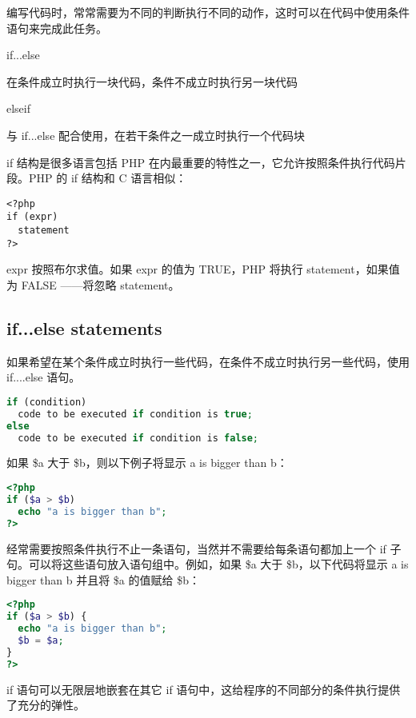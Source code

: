 编写代码时，常常需要为不同的判断执行不同的动作，这时可以在代码中使用条件语句来完成此任务。

\begin{compactitem}
\item if...else

在条件成立时执行一块代码，条件不成立时执行另一块代码

\item elseif

与 if...else 配合使用，在若干条件之一成立时执行一个代码块
\end{compactitem}

if 结构是很多语言包括 PHP 在内最重要的特性之一，它允许按照条件执行代码片段。PHP 的 if 结构和 C 语言相似：

\begin{verbatim}
<?php
if (expr)
  statement
?>
\end{verbatim}

expr 按照布尔求值。如果 expr 的值为 TRUE，PHP 将执行 statement，如果值为 FALSE ——将忽略 statement。



\subsection{if...else statements}

如果希望在某个条件成立时执行一些代码，在条件不成立时执行另一些代码，使用 if....else 语句。

\begin{lstlisting}[language=PHP]
if (condition)
  code to be executed if condition is true;
else
  code to be executed if condition is false; 
\end{lstlisting}


如果 \$a 大于 \$b，则以下例子将显示 a is bigger than b：

\begin{lstlisting}[language=PHP]
<?php
if ($a > $b)
  echo "a is bigger than b";
?>
\end{lstlisting}

经常需要按照条件执行不止一条语句，当然并不需要给每条语句都加上一个 if 子句。可以将这些语句放入语句组中。例如，如果 \$a 大于 \$b，以下代码将显示 a is bigger than b 并且将 \$a 的值赋给 \$b：

\begin{lstlisting}[language=PHP]
<?php
if ($a > $b) {
  echo "a is bigger than b";
  $b = $a;
}
?>
\end{lstlisting}

if 语句可以无限层地嵌套在其它 if 语句中，这给程序的不同部分的条件执行提供了充分的弹性。

